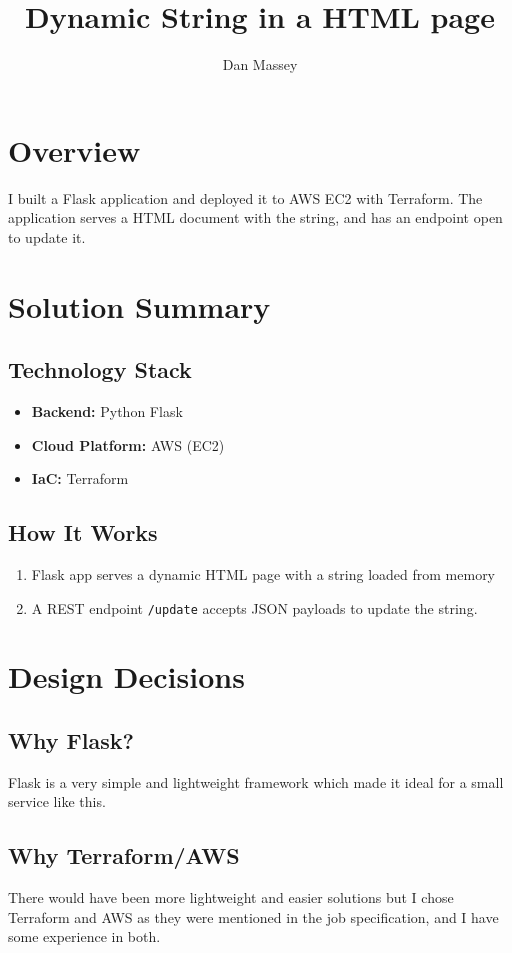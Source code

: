 \documentclass[12pt]{article}
\title{Dynamic String in a HTML page}
\author{Dan Massey}
\begin{document}
\maketitle

\section{Overview}
I built a Flask application and deployed it to AWS EC2 with Terraform. 
The application serves a HTML document with the string, and has an endpoint open to update it. 

\section{Solution Summary}
\subsection*{Technology Stack}
\begin{itemize}
    \item \textbf{Backend:} Python Flask
    \item \textbf{Cloud Platform:} AWS (EC2)
    \item \textbf{IaC:} Terraform
\end{itemize}

\subsection*{How It Works}
\begin{enumerate}
    \item Flask app serves a dynamic HTML page with a string loaded from memory
    \item A REST endpoint \texttt{/update} accepts JSON payloads to update the string.
\end{enumerate}

\section{Design Decisions}
\subsection*{Why Flask?}
Flask is a very simple and lightweight framework which made it ideal for a small service like this. 

\subsection*{Why Terraform/AWS}
There would have been more lightweight and easier solutions but I chose Terraform and AWS as they were mentioned in the job specification, and I have some experience in both.
\end{document}
